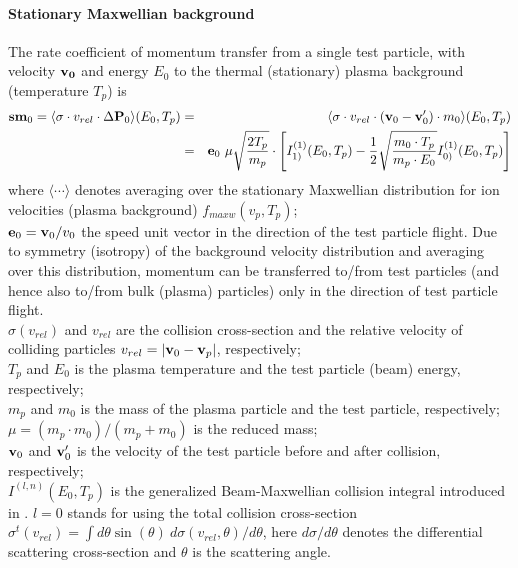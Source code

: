 \documentclass[12pt,dvipdfmx]{article}
\begin{document}
\paragraph{Stationary Maxwellian background}
The rate coefficient of momentum transfer from a single test particle, with velocity ${\bf v_0}$ and energy $E_0$ to the thermal (stationary) plasma background (temperature $T_p$) is
\begin{eqnarray}\label{mom-tally}
{\bf sm}_0=\langle\sigma\cdot v_{rel}\cdot \Delta {\bf P}_0\rangle(E_0,T_p)&=&
\langle\sigma\cdot v_{rel} \cdot \left({\bf v}_0-{\bf v}'_0\right)\cdot m_0\rangle(E_0,T_p)\\\nonumber
&=&
{\bf e}_0 \ \mu\sqrt{\frac{2T_p}{m_p}}\cdot\left[I^{(1)}_{1)}(E_0,T_p)-
          \frac{1}{2}\sqrt{\frac{m_0\cdot T_p}{m_p\cdot E_0}}I^{(1)}_{0)}(E_0,T_p)\right]
\end{eqnarray}
where
$\langle \cdots \rangle$ denotes averaging over the stationary Maxwellian distribution for ion velocities (plasma background) $f_{maxw}(v_p,T_p)$;\\
${\bf e}_0 = {\bf v}_0/v_0$ the speed unit vector in the direction
of the test particle flight. Due to symmetry (isotropy) of the background velocity distribution
and averaging over this distribution, momentum can be transferred to/from test particles (and hence also to/from bulk (plasma) particles) only in
the direction of test particle flight.\\
$\sigma(v_{rel})$ and $v_{rel}$ are the collision cross-section and the relative velocity of colliding particles $v_{rel}=|{\bf v}_0 - {\bf v}_p|$, respectively;\\
$T_p$ and $E_0$ is the plasma temperature and the test particle (beam) energy, respectively;\\
$m_p$ and $m_0$ is the mass of the plasma particle and the test particle, respectively;\\
$\mu=(m_p\cdot m_0)/(m_p+m_0)$ is the reduced mass;\\
${\bf v}_0$ and ${\bf v}'_0$ is the velocity of the test particle before and after collision, respectively;\\
$I^{(l,n)}(E_0,T_p)$ is the generalized Beam-Maxwellian collision integral introduced in \cite{kn:Reiter-Janev}.
$l=0$ stands for using the total collision cross-section $\sigma^t(v_{rel}) = \int d\theta \sin(\theta) \ d\sigma(v_{rel},\theta)/d\theta$, here $d\sigma/d\theta$ denotes the differential scattering cross-section
and $\theta$ is the scattering angle.
\end{document}
